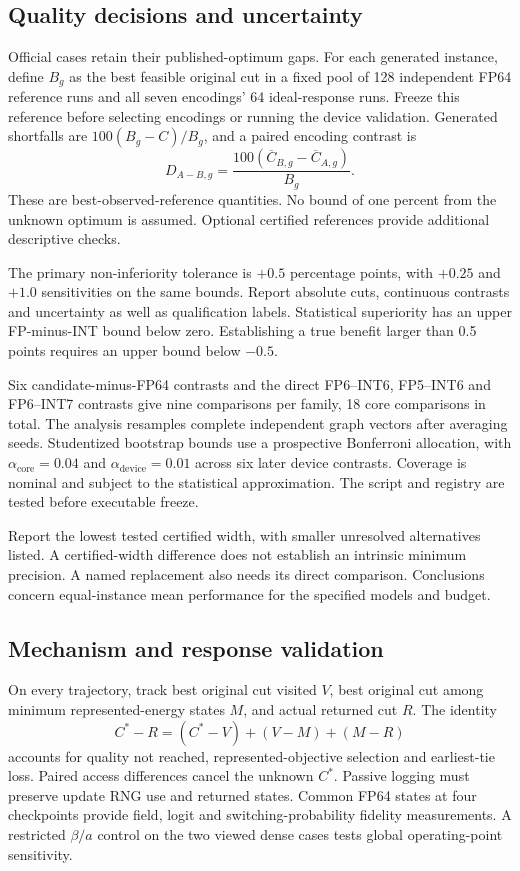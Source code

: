 \subsection{Quality decisions and uncertainty}
Official cases retain their published-optimum gaps. For each
generated instance, define $B_g$ as the best feasible original cut in
a fixed pool of 128 independent FP64 reference runs and all seven
encodings' 64 ideal-response runs. Freeze this reference before
selecting encodings or running the device validation. Generated
shortfalls are $100(B_g-C)/B_g$, and a paired encoding contrast is
\[
 D_{A-B,g}=\frac{100(\overline C_{B,g}-\overline C_{A,g})}{B_g}.
\]
These are best-observed-reference quantities. No bound of one
percent from the unknown optimum is assumed. Optional certified
references provide additional descriptive checks.

The primary non-inferiority tolerance is $+0.5$ percentage points,
with $+0.25$ and $+1.0$ sensitivities on the same bounds. Report
absolute cuts, continuous contrasts and uncertainty as well as
qualification labels. Statistical superiority has an upper
FP-minus-INT bound below zero. Establishing a true benefit larger
than 0.5 points requires an upper bound below $-0.5$.

Six candidate-minus-FP64 contrasts and the direct FP6--INT6,
FP5--INT6 and FP6--INT7 contrasts give nine comparisons per family,
18 core comparisons in total. The analysis resamples complete
independent graph vectors after averaging seeds. Studentized
bootstrap bounds use a prospective Bonferroni allocation, with
$\alpha_{\mathrm{core}}=0.04$ and
$\alpha_{\mathrm{device}}=0.01$ across six later device contrasts.
Coverage is nominal and subject to the statistical approximation.
The script and registry are tested before executable freeze.

Report the lowest tested certified width, with smaller unresolved
alternatives listed. A certified-width difference does not establish
an intrinsic minimum precision. A named replacement also needs its
direct comparison. Conclusions concern equal-instance mean
performance for the specified models and budget.

\subsection{Mechanism and response validation}
On every trajectory, track best original cut visited $V$, best
original cut among minimum represented-energy states $M$, and actual
returned cut $R$. The identity
\[
 C^*-R=(C^*-V)+(V-M)+(M-R)
\]
accounts for quality not reached, represented-objective selection
and earliest-tie loss. Paired access differences cancel the unknown
$C^*$. Passive logging must preserve update RNG use and returned
states. Common FP64 states at four checkpoints provide field, logit
and switching-probability fidelity measurements. A restricted
$\beta/a$ control on the two viewed dense cases tests global
operating-point sensitivity.


